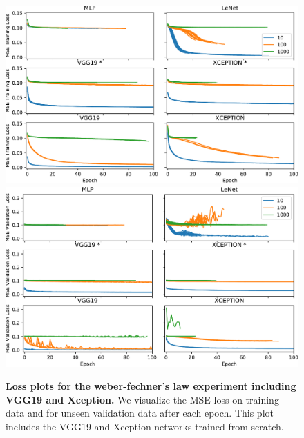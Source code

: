 \documentclass[journal]{vgtc}                %
\begin{document}
\begin{figure}[p]
	\centering
	  \includegraphics[width=\linewidth]{../gfx/weber_training_loss_all.pdf}
	  \includegraphics[width=\linewidth]{../gfx/weber_validation_loss_all.pdf}
  \caption{\textbf{Loss plots for the weber-fechner's law experiment including VGG19 and Xception.} We visualize the MSE loss on training data and for unseen validation data after each epoch. This plot includes the VGG19 and Xception networks trained from scratch.}
	\label{fig:weber_loss_all}
\end{figure}
\end{document}

